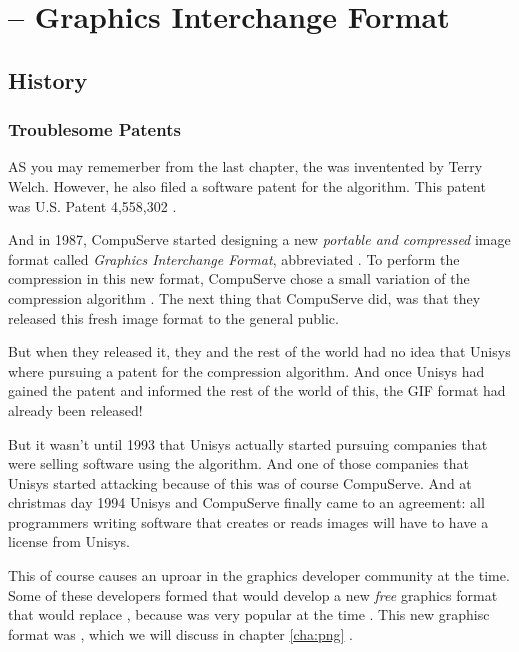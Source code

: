 \begin{comment}
  
\end{comment}

\chapter{\gif -- Graphics Interchange Format}
\label{cha:gif}

\begin{refsection}

  \section{History}

  \subsection{Troublesome Patents}

  AS you may rememerber from the last chapter, the \lzw was
  inventented by Terry Welch. However, he also filed a software patent
  for the algorithm. This patent was U.S. Patent 4,558,302
  \cite{welch85:_u,roelofs09:_histor_portab_networ_graph_png_format}.

  \newcommand{\compus}{CompuServe\xspace}

  And in 1987, \compus started designing a new \textit{portable and
    compressed} image format called \textit{Graphics Interchange
    Format}, abbreviated \gif. To perform the compression in this new
  format, \compus chose a small variation of the compression algorithm
  \lzw. The next thing that \compus did, was that they released this fresh
  image format to the general public.

  But when they released it, they and the rest of the world had no idea
  that Unisys where pursuing a patent for the \lzw compression
  algorithm. And once Unisys had gained the patent and informed the rest
  of the world of this, the GIF format had already been released!

  But it wasn't until 1993 that Unisys actually started pursuing
  companies that were selling software using the \lzw algorithm. And one
  of those companies that Unisys started attacking because of this was
  of course \compus. And at christmas day 1994 Unisys and \compus
  finally came to an agreement: all programmers writing software that
  creates or reads images will have to have a license from Unisys.

  This of course causes an uproar in the graphics developer community
  at the time. Some of these developers formed that would develop a new
  \textit{free} graphics format that would replace \gif, because
  \gif was very popular at the time
  . This
  new graphisc format was \png, which we will discuss in chapter
  \ref{cha:png} \cite{roelofs09:_histor_portab_networ_graph_png_format,caie:_sad}.


\end{refsection}
